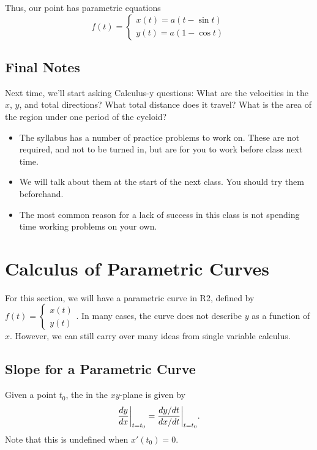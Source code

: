 Thus, our point has parametric equations
\[
    f(t) = \begin{cases}
        x(t) = a(t - \sin t) \\
        y(t) = a(1 - \cos t)
    \end{cases}
\]

\subsection{Final Notes}

Next time, we'll start asking Calculus-y questions: What are the velocities in the \(x\), \(y\), and total directions? What total distance does it travel? What is the area of the region under one period of the cycloid?
\begin{itemize}
    \item The syllabus has a number of practice problems to work on. These are not required, and not to be
          turned in, but are for you to work before class next time.
    \item We will talk about them at the start of the next class. You should try them beforehand.
    \item The most common reason for a lack of success in this class is not spending time working problems on
          your own.
\end{itemize}

\section{Calculus of Parametric Curves}

For this section, we will have a parametric curve in R2, defined by \(f(t) = \begin{cases}
    x(t) \\
    y(t)
\end{cases}.\) 
In many cases, the curve does not describe \(y\) as a function of \(x\). However, we can still carry over many ideas from single variable calculus.

\subsection{Slope for a Parametric Curve}

Given a point \(t_{0}\), the  in the \(xy\)-plane is given by
\[
    \frac{dy}{dx}\bigg|_{t = t_{0}} = \frac{dy/dt}{dx/dt}\bigg|_{t = t_{0}}. \\
\]
Note that this is undefined when \(x'(t_{0}) = 0\). \\

